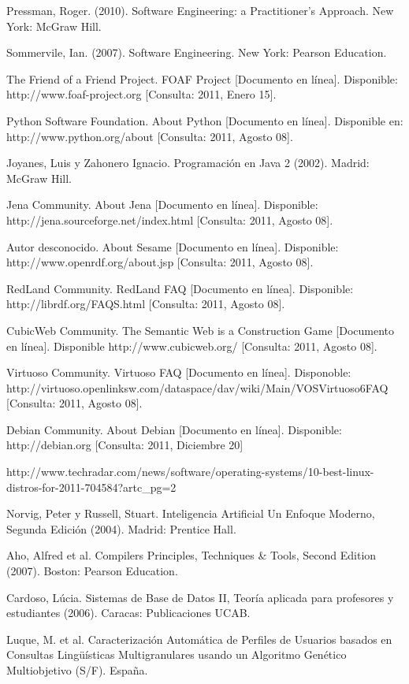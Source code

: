 \begin{thebibliography}{20}
 Pressman, Roger. (2010). Software Engineering: a Practitioner's Approach. New York: McGraw Hill.

 Sommervile, Ian. (2007). Software Engineering. New York: Pearson Education.

 The Friend of a Friend Project. FOAF Project [Documento en línea]. Disponible: http://www.foaf-project.org [Consulta: 2011, Enero 15].

 Python Software Foundation. About Python [Documento en línea]. Disponible en: http://www.python.org/about [Consulta: 2011, Agosto 08].

 Joyanes, Luis y Zahonero Ignacio. Programación en Java 2 (2002). Madrid: McGraw Hill.

 Jena Community. About Jena [Documento en línea]. Disponible: http://jena.sourceforge.net/index.html [Consulta: 2011, Agosto 08].

 Autor desconocido. About Sesame [Documento en línea]. Disponible: http://www.openrdf.org/about.jsp [Consulta: 2011, Agosto 08].

 RedLand Community. RedLand FAQ [Documento en línea]. Disponible: http://librdf.org/FAQS.html [Consulta: 2011, Agosto 08].

 CubicWeb Community. The Semantic Web is a Construction Game [Documento en línea]. Disponible http://www.cubicweb.org/ [Consulta: 2011, Agosto 08].

 Virtuoso Community. Virtuoso FAQ [Documento en línea]. Disponoble: http://virtuoso.openlinksw.com/dataspace/dav/wiki/Main/VOSVirtuoso6FAQ [Consulta: 2011, Agosto 08].

 Debian Community. About Debian [Documento en línea]. Disponible: http://debian.org [Consulta: 2011, Diciembre 20]

 http://www.techradar.com/news/software/operating-systems/10-best-linux-distros-for-2011-704584?artc\_pg=2

 Norvig, Peter y Russell, Stuart. Inteligencia Artificial Un Enfoque Moderno, Segunda Edición (2004). Madrid: Prentice Hall.

 Aho, Alfred et al. Compilers Principles, Techniques & Tools, Second Edition (2007). Boston: Pearson Education.

 Cardoso, Lúcia. Sistemas de Base de Datos II, Teoría aplicada para profesores y estudiantes (2006). Caracas: Publicaciones UCAB.

 Luque, M. et al. Caracterización Automática de Perfiles de Usuarios basados en Consultas Lingüísticas Multigranulares usando un Algoritmo Genético Multiobjetivo (S/F). España.

\end{thebibliography}
